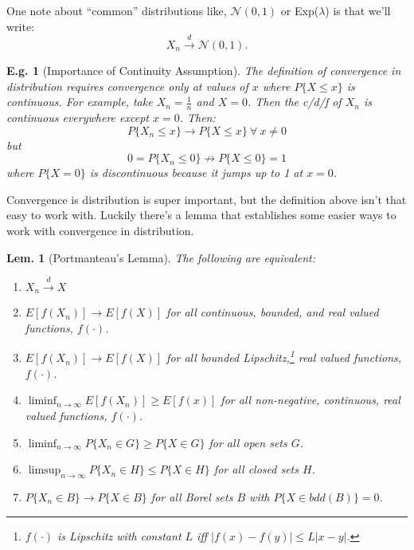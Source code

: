 \documentclass{tufte-book}
\theoremstyle{mytheoremstyle}
\theoremstyle{mylemstyle}
\newtheorem*{lem}{Lem.}
\theoremstyle{mydefstyle}
\newtheorem*{ex}{E.g.}
\begin{document}
\noindent One note about ``common'' distributions like, \(\mathcal{N}(0,1)\) or Exp(\(\lambda\)) is that we'll write:
	\[X_n \overset{d}{\rightarrow} \mathcal{N}(0, 1)\text{.}\]
\begin{ex}[Importance of Continuity Assumption] The definition of convergence in distribution requires convergence only at values of \(x\) where \(P\{X \le x\}\) is continuous. For example, take \(X_n = \frac{1}{n}\) and \(X = 0\). Then the c/d/f of \(X_n\) is continuous everywhere except \(x = 0\). Then:
	\[P\{X_n \le x\} \rightarrow P\{X \le x\}\ \forall\ x \ne 0\]
but
	\[0 = P\{X_n \le 0\} \not \rightarrow P\{X \le 0\} = 1\]
where \(P\{X = 0\}\) is discontinuous because it jumps up to 1 at \(x=0\).
\end{ex}
Convergence is distribution is super important, but the definition above isn't that easy to work with. Luckily there's a lemma that establishes some easier ways to work with convergence in distribution.
\begin{lem}[Portmanteau's Lemma] The following are equivalent:
	\begin{enumerate}
		\item \(X_n \overset{d}{\rightarrow} X\)
		\item \(E[f(X_n)] \rightarrow E[f(X)]\) for all continuous, bounded, and real valued functions, \(f(\cdot)\). 
		\item \(E[f(X_n)] \rightarrow E[f(X)]\) for all bounded Lipschitz,\footnote{\(f(\cdot)\) is Lipschitz with constant \(L\) iff \(|f(x) - f(y)| \le L|x-y|\).} real valued functions, \(f(\cdot)\). 
		\item \(\liminf_{n \rightarrow \infty} E[f(X_n)] \ge E[f(x)]\) for all non-negative, continuous, real valued functions, \(f(\cdot)\). 
		\item \(\liminf_{n \rightarrow \infty} P\{X_n \in G\} \ge P\{X \in G\}\) for all open sets \(G\).
		\item \(\limsup_{n \rightarrow \infty} P\{X_n \in H\} \le P\{X \in H\}\) for all closed sets \(H\).
		\item \(P\{X_n \in B\} \rightarrow P\{X \in B\} \) for all Borel sets \(B\) with \(P\{X\in bdd(B)\} = 0\).
	\end{enumerate}
\end{lem}
\end{document}
